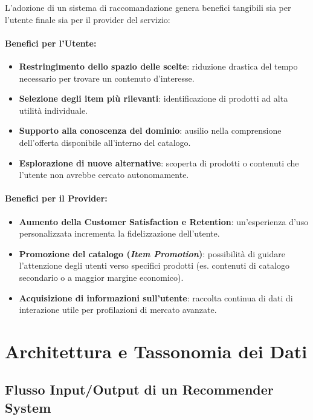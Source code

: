 L'adozione di un sistema di raccomandazione genera benefici tangibili sia per l'utente finale sia per il provider del servizio:

\paragraph{Benefici per l'Utente:}
\begin{itemize}
    \item \textbf{Restringimento dello spazio delle scelte}: riduzione drastica del tempo necessario per trovare un contenuto d'interesse.
    \item \textbf{Selezione degli item più rilevanti}: identificazione di prodotti ad alta utilità individuale.
    \item \textbf{Supporto alla conoscenza del dominio}: ausilio nella comprensione dell'offerta disponibile all'interno del catalogo.
    \item \textbf{Esplorazione di nuove alternative}: scoperta di prodotti o contenuti che l'utente non avrebbe cercato autonomamente.
\end{itemize}

\paragraph{Benefici per il Provider:}
\begin{itemize}
    \item \textbf{Aumento della Customer Satisfaction e Retention}: un'esperienza d'uso personalizzata incrementa la fidelizzazione dell'utente.
    \item \textbf{Promozione del catalogo (\textit{Item Promotion})}: possibilità di guidare l'attenzione degli utenti verso specifici prodotti (es. contenuti di catalogo secondario o a maggior margine economico).
    \item \textbf{Acquisizione di informazioni sull'utente}: raccolta continua di dati di interazione utile per profilazioni di mercato avanzate.
\end{itemize}


\section{Architettura e Tassonomia dei Dati}
\subsection{Flusso Input/Output di un Recommender System}

